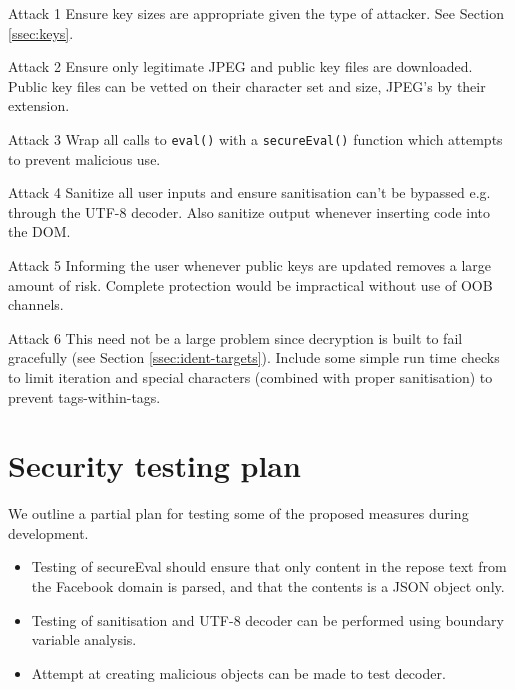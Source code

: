 \begin{desc}
    \item[Attack 1] Ensure key sizes are appropriate given the type of attacker. See Section \ref{ssec:keys}.

    \item[Attack 2] Ensure only legitimate JPEG and public key files are downloaded. Public key files can be vetted on their character set and size, JPEG's by their extension.

    \item[Attack 3] Wrap all calls to {\tt eval()} with a {\tt secureEval()} function which attempts to prevent malicious use. 

    \item[Attack 4] Sanitize all user inputs and ensure sanitisation can't be bypassed e.g. through the UTF-8 decoder\cite{utf8}. Also sanitize output whenever inserting code into the DOM.

    \item[Attack 5] Informing the user whenever public keys are updated removes a large amount of risk. Complete protection would be impractical without use of OOB channels.

    \item[Attack 6] This need not be a large problem since decryption is built to fail gracefully (see Section \ref{ssec:ident-targets}). Include some simple run time checks to limit iteration and special characters (combined with proper sanitisation) to prevent tags-within-tags.
\end{desc}

\section{Security testing plan}

We outline a partial plan for testing some of the proposed measures during development.

\begin{itemize}
    \item Testing of secureEval should ensure that only content in the repose text from the Facebook domain is parsed, and that the contents is a JSON object only.
    
    \item Testing of sanitisation and UTF-8 decoder can be performed using boundary variable analysis.
    
    \item Attempt at creating malicious objects can be made to test decoder.
\end{itemize}
        